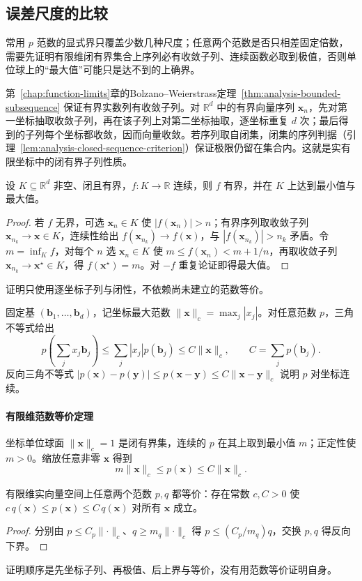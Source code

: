 \subsection{误差尺度的比较}
\label{sec:ls-error-scale-comparison}

常用 $p$ 范数的显式界只覆盖少数几种尺度；任意两个范数是否只相差固定倍数，需要先证明有限维闭有界集合上序列必有收敛子列、连续函数必取到极值，否则单位球上的“最大值”可能只是达不到的上确界。

第~\ref{chap:function-limits}章的Bolzano--Weierstrass定理~\ref{thm:analysis-bounded-subsequence} 保证有界实数列有收敛子列。对 $\mathbb R^d$ 中的有界向量序列 $\bm x_n$，先对第一坐标抽取收敛子列，再在该子列上对第二坐标抽取，逐坐标重复 $d$ 次；最后得到的子列每个坐标都收敛，因而向量收敛。若序列取自闭集，闭集的序列判据（引理~\ref{lem:analysis-closed-sequence-criterion}）保证极限仍留在集合内。这就是实有限坐标中的闭有界子列性质。

\begin{theorem}[有限维闭有界集上的极值定理]
\label{thm:ls-extreme-value}
设 $K\subseteq\mathbb R^d$ 非空、闭且有界，$f:K\to\mathbb R$ 连续，则 $f$ 有界，并在 $K$ 上达到最小值与最大值。
\end{theorem}
\begin{proof}
若 $f$ 无界，可选 $\bm x_n\in K$ 使 $|f(\bm x_n)|>n$；有界序列取收敛子列 $\bm x_{n_k}\to\bm x\in K$，连续性给出 $f(\bm x_{n_k})\to f(\bm x)$，与 $|f(\bm x_{n_k})|>n_k$ 矛盾。令 $m=\inf_K f$，对每个 $n$ 选 $\bm x_n\in K$ 使 $m\leq f(\bm x_n)<m+1/n$，再取收敛子列 $\bm x_{n_k}\to\bm x^\star\in K$，得 $f(\bm x^\star)=m$。对 $-f$ 重复论证即得最大值。
\end{proof}
证明只使用逐坐标子列与闭性，不依赖尚未建立的范数等价。

固定基 $(\bm b_1,\ldots,\bm b_d)$，记坐标最大范数 $\lVert\bm x\rVert_c=\max_j|x_j|$。对任意范数 $p$，三角不等式给出
\[
 p(\sum_jx_j\bm b_j)\leq\sum_j|x_j|p(\bm b_j)\leq C\lVert\bm x\rVert_c,
 \qquad C=\sum_jp(\bm b_j).
\]
反向三角不等式 $|p(\bm x)-p(\bm y)|\leq p(\bm x-\bm y)\leq C\lVert\bm x-\bm y\rVert_c$ 说明 $p$ 对坐标连续。

\paragraph{有限维范数等价定理}

坐标单位球面 $\lVert\bm x\rVert_c=1$ 是闭有界集，连续的 $p$ 在其上取到最小值 $m$；正定性使 $m>0$。缩放任意非零 $\bm x$ 得到
\begin{equation}
 m\lVert\bm x\rVert_c\leq p(\bm x)\leq C\lVert\bm x\rVert_c.
 \label{eq:linear-algebra-finite-norm-equivalence}
\end{equation}
\begin{theorem}[有限维范数等价]
\label{thm:ls-norm-equivalence}
有限维实向量空间上任意两个范数 $p,q$ 都等价：存在常数 $c,C>0$ 使 $c\,q(\bm x)\leq p(\bm x)\leq C\,q(\bm x)$ 对所有 $\bm x$ 成立。
\end{theorem}
\begin{proof}
分别由 $p\leq C_p\lVert\cdot\rVert_c$、$q\geq m_q\lVert\cdot\rVert_c$ 得 $p\leq(C_p/m_q)q$，交换 $p,q$ 得反向下界。
\end{proof}
证明顺序是先坐标子列、再极值、后上界与等价，没有用范数等价证明自身。


